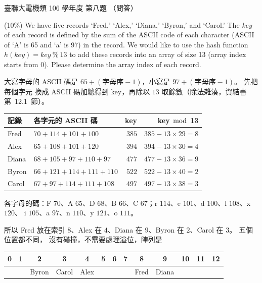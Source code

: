 \begin{pastexam}[label={px:ust-106-ee-ds-08}]{臺聯大電機類 106 學年度 第八題}
（問答）

(10\%) We have five records `Fred,' `Alex,' `Diana,' `Byron,' and `Carol.' The \textit{key} of each
record is defined by the sum of the ASCII code of each character (ASCII of `A' is 65 and `a' is 97) in
the record. We would like to use the hash function $h(\mathit{key}) = \mathit{key}\ \%\ 13$ to add these
records into an array of size 13 (array index starts from 0). Please determine the array index of each
record.
\end{pastexam}

\begin{pastsoln}
大寫字母的 ASCII 碼是 $65 + (\text{字母序} - 1)$，小寫是 $97 + (\text{字母序} - 1)$。 先把每個字元
換成 ASCII 碼加總得到 key，再除以 $13$ 取餘數（除法雜湊，資結書第~12.1~節）。

\begin{center}
\begin{tabular}{llrr}
\toprule
記錄 & 各字元的 ASCII 碼 & key & key $\bmod$ 13 \\
\midrule
Fred  & $70 + 114 + 101 + 100$ & $385$ & $385 - 13 \times 29 = 8$ \\
Alex  & $65 + 108 + 101 + 120$ & $394$ & $394 - 13 \times 30 = 4$ \\
Diana & $68 + 105 + 97 + 110 + 97$ & $477$ & $477 - 13 \times 36 = 9$ \\
Byron & $66 + 121 + 114 + 111 + 110$ & $522$ & $522 - 13 \times 40 = 2$ \\
Carol & $67 + 97 + 114 + 111 + 108$ & $497$ & $497 - 13 \times 38 = 3$ \\
\bottomrule
\end{tabular}
\end{center}

各字母的碼：F $70$、A $65$、D $68$、B $66$、C $67$；r $114$、e $101$、d $100$、l $108$、x $120$、
i $105$、a $97$、n $110$、y $121$、o $111$。

所以 Fred 放在索引 $8$、Alex 在 $4$、Diana 在 $9$、Byron 在 $2$、Carol 在 $3$。 五個位置都不同，
沒有碰撞，不需要處理溢位，陣列是
\begin{center}
\begin{tabular}{*{13}{c}}
\toprule
0 & 1 & 2 & 3 & 4 & 5 & 6 & 7 & 8 & 9 & 10 & 11 & 12 \\
\midrule
 & & Byron & Carol & Alex & & & & Fred & Diana & & & \\
\bottomrule
\end{tabular}
\end{center}
\end{pastsoln}
